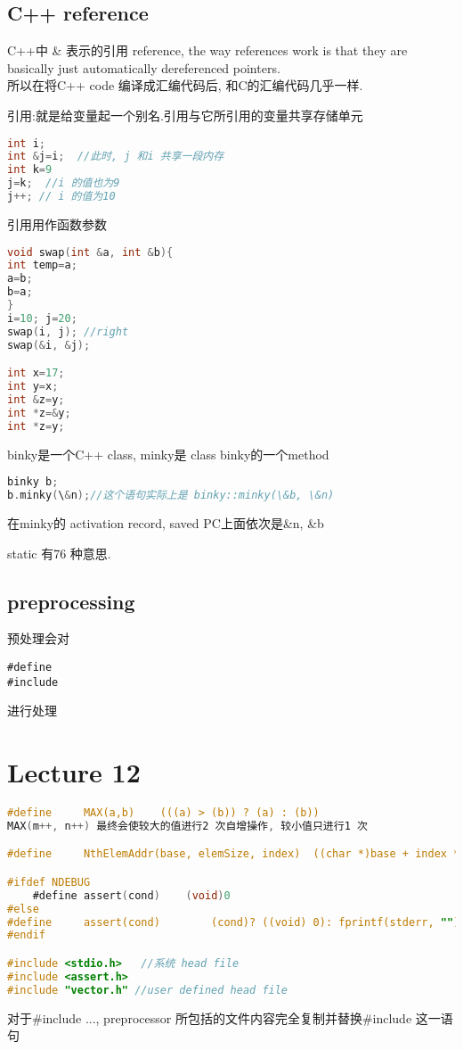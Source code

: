 \documentclass{article}
\begin{document}
\subsection{C++ reference}
C++中 \& 表示的引用 reference, the way references work is that they are basically just automatically dereferenced pointers.\\
所以在将C++ code 编译成汇编代码后, 和C的汇编代码几乎一样.

引用:就是给变量起一个别名.引用与它所引用的变量共享存储单元
\begin{lstlisting}[language = C]
int i;
int &j=i;  //此时, j 和i 共享一段内存
int k=9
j=k;  //i 的值也为9
j++; // i 的值为10
\end{lstlisting}

引用用作函数参数
\begin{lstlisting}[language = C]
void swap(int &a, int &b){
int temp=a;
a=b;
b=a;
}
i=10; j=20;
swap(i, j); //right
swap(&i, &j);

int x=17;
int y=x;
int &z=y;
int *z=&y;
int *z=y;
\end{lstlisting}

binky是一个C++ class, minky是 class binky的一个method
\begin{lstlisting}[language = C]
binky b;
b.minky(\&n);//这个语句实际上是 binky::minky(\&b, \&n)
\end{lstlisting}
在minky的 activation record, saved PC上面依次是\&n, \&b

static 有76 种意思.

\subsection{preprocessing}
预处理会对
\begin{verbatim}
#define
#include
\end{verbatim}
进行处理

\section{Lecture 12}
\begin{lstlisting}[language = C]
#define 	MAX(a,b)	(((a) > (b)) ? (a) : (b))
MAX(m++, n++) 最终会使较大的值进行2 次自增操作, 较小值只进行1 次

#define 	NthElemAddr(base, elemSize, index) 	((char *)base + index * elemSize)

#ifdef NDEBUG
	#define assert(cond)	(void)0
#else
#define		assert(cond) 		(cond)? ((void) 0): fprintf(stderr, ""), exit(0)
#endif

#include <stdio.h>   //系统 head file
#include <assert.h>
#include "vector.h" //user defined head file
\end{lstlisting}
对于\#include ..., preprocessor 所包括的文件内容完全复制并替换\#include  这一语句
\end{document}
